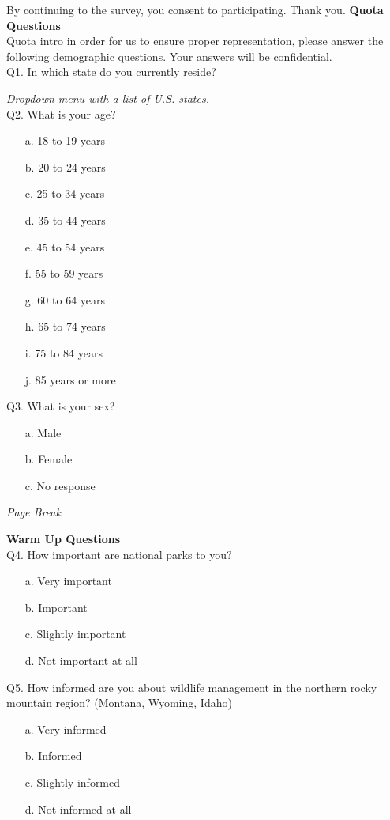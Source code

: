 \documentclass[english,12pt]{article}
\begin{document}
By continuing to the survey, you consent to participating. Thank you.
\newpage
{\large\textbf{Quota Questions}}\\
\noindent Quota intro in order for us to ensure proper representation, please answer the following demographic questions. Your answers will be confidential.\\

Q1. In which state do you currently reside?

\textit{Dropdown menu with a list of U.S. states.}\\

Q2. What is your age?
\begin{enumerate}
    \item[a.] 18 to 19 years
    \item[b.] 20 to 24 years
    \item[c.] 25 to 34 years
    \item[d.] 35 to 44 years
    \item[e.] 45 to 54 years
    \item[f.] 55 to 59 years
    \item[g.] 60 to 64 years
    \item[h.] 65 to 74 years
    \item[i.] 75 to 84 years
    \item[j.] 85 years or more
\end{enumerate}

Q3. What is your sex?
\begin{enumerate}
    \item[a.] Male
    \item[b.] Female
    \item[c.] No response
\end{enumerate}
\textit{Page Break}
\newpage

{\large\textbf{Warm Up Questions}}\\
Q4. How important are national parks to you?
\begin{enumerate}
    \item[a.] Very important
    \item[b.] Important
    \item[c.] Slightly important
    \item[d.] Not important at all
\end{enumerate}

Q5. How informed are you about wildlife management in the northern rocky mountain region? (Montana, Wyoming, Idaho)
\begin{enumerate}
    \item[a.] Very informed
    \item[b.] Informed
    \item[c.] Slightly informed
    \item[d.] Not informed at all
\end{enumerate}
\end{document}
